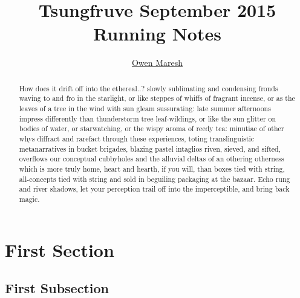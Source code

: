 \documentclass[reqno,8pt]{atalart}
\newcommand{\Author}{\href{http://owen.maresh.info}{Owen Maresh}}
\newcommand{\Title}{Tsungfruve September 2015 Running Notes}
\begin{document}
\title{\Title}
\author{\Author}
\begin{abstract}
How does it drift off into the ethereal..?
slowly sublimating and condensing fronds 
waving to and fro in the starlight, or like steppes of whiffs of fragrant incense, or as the leaves of a tree in the wind with sun gleam sussurating: late summer afternoons impress differently than thunderstorm tree leaf-wildings, or like the sun glitter on bodies of water, or starwatching, or the wispy aroma of reedy tea: minutiae of other whys diffract and rarefact through these experiences, toting translinguistic metanarratives in bucket brigades, blazing pastel intaglios riven, sieved, and sifted, overflows our conceptual cubbyholes and the alluvial deltas of an othering otherness which is more truly home, heart and hearth, if you will, than boxes tied with string, all-concepts tied with string and sold in beguiling packaging at the bazaar. Echo rung and river shadows, let your perception trail off into the imperceptible, and bring back magic.
\end{abstract}
\thispagestyle{empty}
\maketitle


\section{First Section}
\subsection{First Subsection}






\begin{bibdiv}
\begin{biblist}





\end{biblist}
\end{bibdiv}
\end{document}
